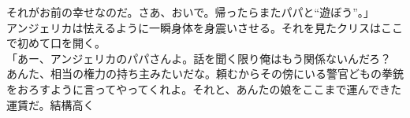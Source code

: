 \documentclass[b5j,10pt,openany]{jsbook}
\begin{document}
それがお前の幸せなのだ。さあ、おいで。帰ったらまたパパと``遊ぼう''。」\\アンジェリカは怯えるように一瞬身体を身震いさせる。それを見たクリスはここで初めて口を開く。\\「あー、アンジェリカのパパさんよ。話を聞く限り俺はもう関係ないんだろ？　あんた、相当の権力の持ち主みたいだな。頼むからその傍にいる警官どもの拳銃をおろすように言ってやってくれよ。それと、あんたの娘をここまで運んできた運賃だ。結構高く
\end{document}
